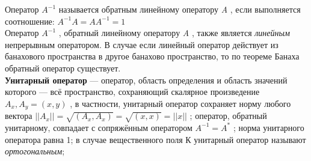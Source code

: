 \documentclass[12pt,a4paper]{article}
\begin{document}
Оператор $A^{-1}$ называется обратным линейному оператору {\it A} , если выполняется соотношение:
$A^{-1}A=AA^{-1}=1$\\

Оператор $A^{-1}$ , обратный линейному оператору {\it A} , также является {\it линейным} непрерывным оператором. В случае если линейный оператор действует из банахового пространства в другое банахово пространство, то по теореме Банаха обратный оператор существует.\\

{\bfseries Унитарный оператор} — оператор, область определения и область значений которого — всё пространство, сохраняющий скалярное произведение $A_x , A_y = (x, y)$ , в частности, унитарный оператор сохраняет норму любого вектора $||A_x || = \sqrt{(A_x , A_x )} = \sqrt{(x, x)} = ||x||$ ; оператор, обратный унитарному, совпадает с сопряжённым оператором $A^{-1} = A^{*}$ ; норма унитарного оператора равна 1; в случае вещественного поля К унитарный оператор называют {\it ортогональным}; 
\end{document}
